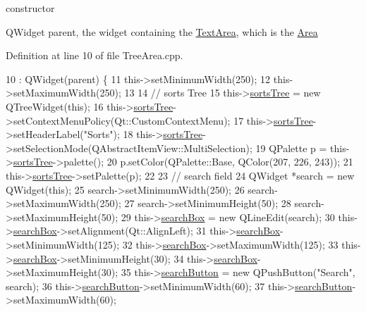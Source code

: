 constructor 

Q\+Widget parent, the widget containing the \hyperlink{classTextArea}{Text\+Area}, which is the \hyperlink{classArea}{Area} 

Definition at line 10 of file Tree\+Area.\+cpp.


\begin{DoxyCode}
10                                  : QWidget(parent) \{
11     this->setMinimumWidth(250);
12     this->setMaximumWidth(250);
13 
14     \textcolor{comment}{// sorts Tree}
15     this->\hyperlink{classTreeArea_ad323879d9e2e64b18dae18fe757b1b0e}{sortsTree} = \textcolor{keyword}{new} QTreeWidget(\textcolor{keyword}{this});
16     this->\hyperlink{classTreeArea_ad323879d9e2e64b18dae18fe757b1b0e}{sortsTree}->setContextMenuPolicy(Qt::CustomContextMenu);
17     this->\hyperlink{classTreeArea_ad323879d9e2e64b18dae18fe757b1b0e}{sortsTree}->setHeaderLabel(\textcolor{stringliteral}{"Sorts"});
18     this->\hyperlink{classTreeArea_ad323879d9e2e64b18dae18fe757b1b0e}{sortsTree}->setSelectionMode(QAbstractItemView::MultiSelection);
19     QPalette p = this->\hyperlink{classTreeArea_ad323879d9e2e64b18dae18fe757b1b0e}{sortsTree}->palette();
20     p.setColor(QPalette::Base, QColor(207, 226, 243));
21     this->\hyperlink{classTreeArea_ad323879d9e2e64b18dae18fe757b1b0e}{sortsTree}->setPalette(p);
22 
23     \textcolor{comment}{// search field}
24     QWidget *search = \textcolor{keyword}{new} QWidget(\textcolor{keyword}{this});
25     search->setMinimumWidth(250);
26     search->setMaximumWidth(250);
27     search->setMinimumHeight(50);
28     search->setMaximumHeight(50);
29     this->\hyperlink{classTreeArea_a609dd67c5b1d7bb8d0661054338f9561}{searchBox} = \textcolor{keyword}{new} QLineEdit(search);
30     this->\hyperlink{classTreeArea_a609dd67c5b1d7bb8d0661054338f9561}{searchBox}->setAlignment(Qt::AlignLeft);
31     this->\hyperlink{classTreeArea_a609dd67c5b1d7bb8d0661054338f9561}{searchBox}->setMinimumWidth(125);
32     this->\hyperlink{classTreeArea_a609dd67c5b1d7bb8d0661054338f9561}{searchBox}->setMaximumWidth(125);
33     this->\hyperlink{classTreeArea_a609dd67c5b1d7bb8d0661054338f9561}{searchBox}->setMinimumHeight(30);
34     this->\hyperlink{classTreeArea_a609dd67c5b1d7bb8d0661054338f9561}{searchBox}->setMaximumHeight(30);
35     this->\hyperlink{classTreeArea_a682ba9e29364cbfca7ad726a6a630907}{searchButton} = \textcolor{keyword}{new} QPushButton(\textcolor{stringliteral}{"Search"}, search);
36     this->\hyperlink{classTreeArea_a682ba9e29364cbfca7ad726a6a630907}{searchButton}->setMinimumWidth(60);
37     this->\hyperlink{classTreeArea_a682ba9e29364cbfca7ad726a6a630907}{searchButton}->setMaximumWidth(60);

\end{DoxyCode}
